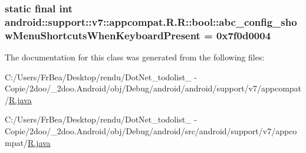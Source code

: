 \hypertarget{classandroid_1_1support_1_1v7_1_1appcompat_1_1_r_1_1bool_6a9aa70356735de0302aaec8a0d55d3b}{
\subsubsection[{abc\_\-config\_\-showMenuShortcutsWhenKeyboardPresent}]{\setlength{\rightskip}{0pt plus 5cm}static final int android::support::v7::appcompat.R.R::bool::abc\_\-config\_\-showMenuShortcutsWhenKeyboardPresent = 0x7f0d0004}}
\label{classandroid_1_1support_1_1v7_1_1appcompat_1_1_r_1_1bool_6a9aa70356735de0302aaec8a0d55d3b}




The documentation for this class was generated from the following files:\begin{CompactItemize}
\item 
C:/Users/FrBea/Desktop/rendu/DotNet\_\-todolist\_ - Copie/2doo/\_\-2doo.Android/obj/Debug/android/android/support/v7/appcompat/\hyperlink{android_2support_2v7_2appcompat_2_r_8java}{R.java}\item 
C:/Users/FrBea/Desktop/rendu/DotNet\_\-todolist\_ - Copie/2doo/\_\-2doo.Android/obj/Debug/android/src/android/support/v7/appcompat/\hyperlink{src_2android_2support_2v7_2appcompat_2_r_8java}{R.java}\end{CompactItemize}
